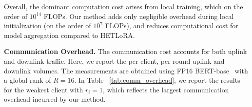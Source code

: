 \documentclass{article} %
\begin{document}
\begin{table}[h]

\centering
\renewcommand{\arraystretch}{1.3}
\caption{{Computation overhead of Fed-PLoRA compared with SOTA methods.}}
\label{tab:compute_overhead}
\end{table}

{Overall, the dominant computation cost arises from local training, which on the order of $10^{14}$ FLOPs. Our method adds only negligible overhead during local initialization (on the order of $10^{7}$ FLOPs), and reduces computational cost for model aggregation compared to HETLoRA.
}




{\noindent\textbf{Communication Overhead.}
The communication cost accounts for both uplink and downlink traffic.}
%
{Here, we report the per-client, per-round uplink and downlink volumes. The measurements are obtained using FP16 BERT-base~\cite{devlin2019bert} with a global rank of $R{=}16$. In Table ~\ref{tab:comm_overhead}, we report the results for the weakest client with $r_i=1$, which reflects the largest communication overhead incurred by our method.}
\end{document}
